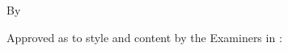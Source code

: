 

\parbox{\textwidth}{\centering\MakeUppercase{
\fontsize{14pt}{14pt}\selectfont    %
\thetitle
}
\fontsize{12pt}{14pt}\selectfont    %

\vspace{0.65in}{\noindent\newline\theThesisType}

\vspace{14pt}
By

\vspace{14pt}
{\theauthor}

}


\vspace{28pt}\noindent
{\hspace{0.5em} Approved as to style and content by the Examiners in \theDefenseDate:}
%
\vspace{28pt}
\thispagestyle{empty}

